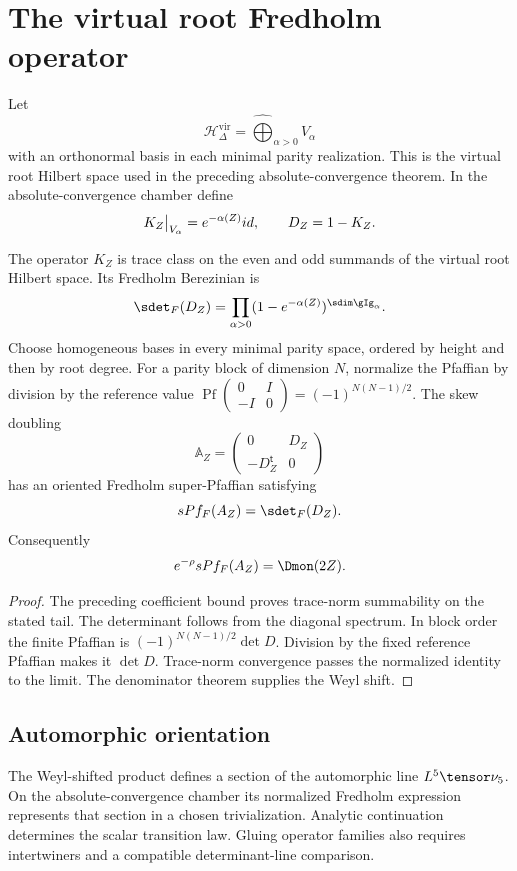 \chapter{The virtual root Fredholm operator}
Let
\[
 \mathcal H^{\mathrm{vir}}_\Delta
 =\widehat\bigoplus_{\alpha>0}V_\alpha
\]
with an orthonormal basis in each minimal parity realization.
This is the virtual root Hilbert space used in the preceding
absolute-convergence theorem.  In the absolute-convergence chamber define
\[
 K_Z\big|_{V_\alpha}=e^{-\alpha(Z)}id,
 \qquad
 D_Z=1-K_Z.
\]

\begin{theorem}
The operator $K_Z$ is trace class on the even and odd summands of the virtual root Hilbert space.  Its Fredholm Berezinian is
\[
 \sdet_F(D_Z)
 =\prod_{\alpha>0}(1-e^{-\alpha(Z)})^{\sdim\gIg_\alpha}.
\]
Choose homogeneous bases in every minimal parity space, ordered by height and then by root degree.
For a parity block of dimension $N$, normalize the Pfaffian by division by the reference value $\operatorname{Pf}\left(\begin{smallmatrix}0&I\\-I&0\end{smallmatrix}\right)=(-1)^{N(N-1)/2}$.
The skew doubling
\[
 \mathbb A_Z=
 \begin{pmatrix}0&D_Z\\-D_Z^{\mathsf t}&0\end{pmatrix}
\]
has an oriented Fredholm super-Pfaffian satisfying
\[
 \operatorname{sPf}_F(\mathbb A_Z)=\sdet_F(D_Z).
\]
Consequently
\[
 e^{-\rho}\operatorname{sPf}_F(\mathbb A_Z)=\Dmon(2Z).
\]
\end{theorem}
\begin{proof}
The preceding coefficient bound proves trace-norm summability on the stated tail.
The determinant follows from the diagonal spectrum.
In block order the finite Pfaffian is $(-1)^{N(N-1)/2}\det D$. Division by the fixed reference Pfaffian makes it $\det D$.
Trace-norm convergence passes the normalized identity to the limit.
The denominator theorem supplies the Weyl shift.
\end{proof}

\section{Automorphic orientation}
The Weyl-shifted product defines a section of the automorphic line $\mathcal L^5\tensor\nu_5$.
On the absolute-convergence chamber its normalized Fredholm expression represents that section in a chosen trivialization.
Analytic continuation determines the scalar transition law.
Gluing operator families also requires intertwiners and a compatible determinant-line comparison.

